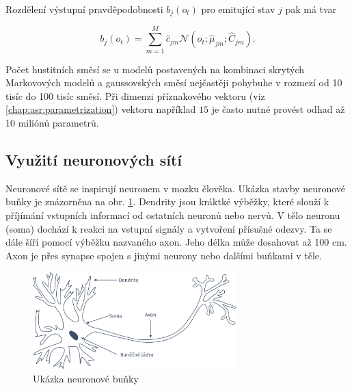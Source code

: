 
\noindent Rozdělení výstupní pravděpodobnosti $b_j\left(o_t\right)$ pro emitující stav $j$ pak má tvar

\begin{equation}
   b_{j}\left(o_t\right) = \sum_{m=1}^{M} \hat{c}_{jm} \mathcal{N}\left(o_t; \hat{\mu}_{jm}; \hat{C}_{jm}\right).
   \label{eq:asr:acoustic:gmm:output}
 \end{equation}

\noindent Počet hustitních směsí se u modelů postavených na kombinaci skrytých Markovových modelů a gaussovských směsí nejčastěji pohybuhe v rozmezí od 10 tisíc do 100 tisíc směsí. Při dimenzi příznakového vektoru (viz \ref{chap:asr:parametrization}) vektoru například $15$ je často nutné provést odhad až 10 miliónů parametrů.

\subsection{Využití neuronových sítí}
\label{chap:asr:acoustic:DNN}

Neuronové sítě se inspirují neuronem v mozku člověka. Ukázka stavby neuronové buňky je znázorněna na obr. \ref{fig:asr:acoustic:dnn:neuron:human}. Dendrity jsou kráktké výběžky, které slouží k příjímání vstupních informací od ostatních neuronů nebo nervů. V tělo neuronu (soma) dochází k reakci na vstupní signály a vytvoření přísušné odezvy. Ta se dále šíří pomocí výběžku nazvaného axon. Jeho délka může dosahovat až 100 cm. Axon je přes synapse spojen s jinými neurony nebo dalšími buňkami v těle.

\begin{figure}[hbpt]
  \centering
  \includegraphics[width=0.7\textwidth]{./ch4-asr/img/neuron-human.pdf}
  \caption{Ukázka neuronové buňky}
  \label{fig:asr:acoustic:dnn:neuron:human}
\end{figure}

